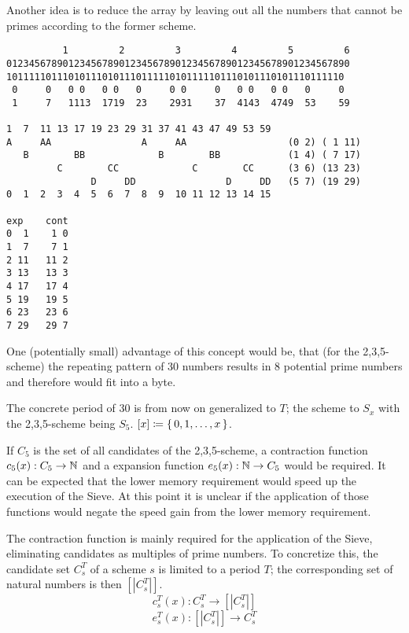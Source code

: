 \documentclass[a4paper,10pt]{article}
\begin{document}

Another idea is to reduce the array by leaving out all the numbers
that cannot be primes according to the former scheme.

\begin{small}
\begin{verbatim}
          1         2         3         4         5         6
0123456789012345678901234567890123456789012345678901234567890
101111101110101110101110111110101111101110101110101110111110
 0     0   0 0   0 0   0     0 0     0   0 0   0 0   0     0
 1     7   1113  1719  23    2931    37  4143  4749  53    59

1  7  11 13 17 19 23 29 31 37 41 43 47 49 53 59
A     AA                A     AA                  (0 2) ( 1 11)
   B        BB             B        BB            (1 4) ( 7 17)
         C        CC             C        CC      (3 6) (13 23)
               D     DD                D     DD   (5 7) (19 29)
0  1  2  3  4  5  6  7  8  9  10 11 12 13 14 15

exp    cont
0  1    1 0
1  7    7 1
2 11   11 2
3 13   13 3
4 17   17 4
5 19   19 5
6 23   23 6
7 29   29 7
\end{verbatim}
\end{small}

One (potentially small) advantage of this concept would be,
that (for the 2,3,5-scheme) the repeating pattern of 30 numbers
results in 8 potential prime numbers and therefore would fit into a byte.

The concrete period of 30 is from now on generalized to $T$;
the scheme to $S_x$ with the 2,3,5-scheme being $S_5$.
$[x] \coloneq \lbrace \, {0,1,\dots,x} \, \rbrace$.

If $C_5$ is the set of all candidates of the 2,3,5-scheme,
a contraction function $c_5(x): C_5 \rightarrow \mathbb{N}$
and a expansion function $e_5(x): \mathbb{N} \rightarrow C_5$ would be required.
It can be expected that the lower memory requirement would speed up the
execution of the Sieve.
At this point it is unclear if the application of those functions
would negate the speed gain from the lower memory requirement.

The contraction function is mainly required for the application of the Sieve,
eliminating candidates as multiples of prime numbers.
To concretize this, the candidate set $C_s^T$ of a scheme $s$ is limited to a period $T$;
the corresponding set of natural numbers is then $[|C_s^T|]$.
$$c_s^T(x): C_s^T \longrightarrow [|C_s^T|]$$
$$e_s^T(x): [|C_s^T|] \longrightarrow C_s^T$$
\end{document}
